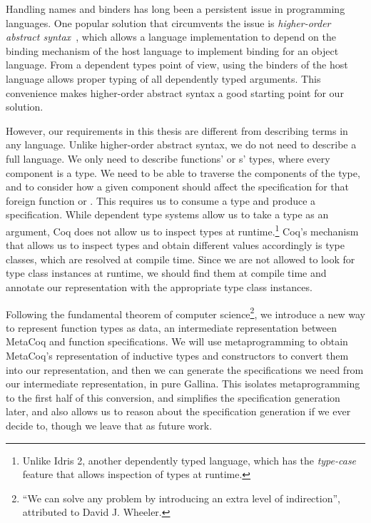 Handling names and binders has long been a persistent issue in programming languages. One popular solution that circumvents the issue is \emph{higher-order abstract syntax}~\cite{hoas}, which allows a language implementation to depend on the binding mechanism of the \gls{host language} to implement binding for an \gls{object language}. From a dependent types point of view, using the binders of the \gls{host language} allows proper typing of all dependently typed arguments. This convenience makes higher-order abstract syntax a good starting point for our solution.

However, our requirements in this thesis are different from describing terms in any language. Unlike higher-order abstract syntax, we do not need to describe a full language. We only need to describe functions' or \constructor{}s' types, where every component is a type. We need to be able to traverse the components of the type, and to consider how a given component should affect the specification for that \gls{foreign function} or \constructor{}. This requires us to consume a type and produce a specification. While dependent type systems allow us to take a type as an argument, Coq does not allow us to inspect types at runtime.\footnote{Unlike Idris 2, another dependently typed language, which has the \emph{type-case} feature that allows inspection of types at runtime.} Coq's mechanism that allows us to inspect types and obtain different values accordingly is type classes, which are resolved at compile time. Since we are not allowed to look for type class instances at runtime, we should find them at compile time and annotate our representation with the appropriate type class instances.

Following the fundamental theorem of computer science\footnote{``We can solve any problem by introducing an extra level of indirection'', attributed to David J. Wheeler.}, we introduce a new way to represent function types as data, an intermediate representation between MetaCoq and function specifications. We will use \gls{metaprogramming} to obtain MetaCoq's representation of inductive types and constructors to convert them into our representation, and then we can generate the specifications we need from our intermediate representation, in pure \gls{Gallina}. This isolates \gls{metaprogramming} to the first half of this conversion, and simplifies the specification generation later, and also allows us to reason about the specification generation if we ever decide to, though we leave that as future work.

